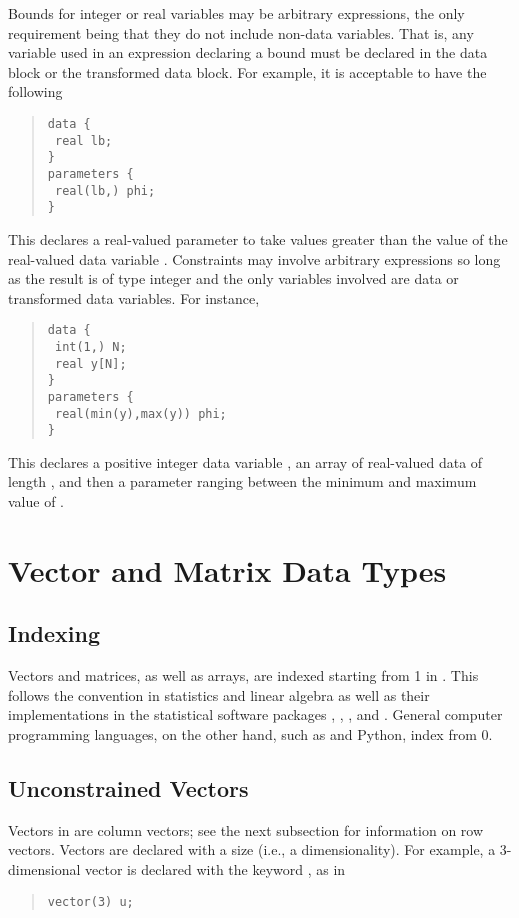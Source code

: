 Bounds for integer or real variables may be arbitrary expressions, the
only requirement being that they do not include non-data variables.
That is, any variable used in an expression declaring a bound must be
declared in the data block or the transformed data block.  For
example, it is acceptable to have the following
%
\begin{quote}
\begin{Verbatim}
data { 
 real lb;
}
parameters {
 real(lb,) phi;
}
\end{Verbatim}
\end{quote}
%
This declares a real-valued parameter  to take values
greater than the value of the real-valued data variable .
Constraints may involve arbitrary expressions so long as the result is
of type integer and the only variables involved are data or
transformed data variables.  For instance,
\begin{quote}
\begin{Verbatim}
data { 
 int(1,) N;
 real y[N];
}
parameters {
 real(min(y),max(y)) phi;
}
\end{Verbatim}
\end{quote}
%
This declares a positive integer data variable , an array  of
real-valued data of length , and then a parameter ranging
between the minimum and maximum value of .


\section{Vector and Matrix Data Types}

\subsection{Indexing}

Vectors and matrices, as well as arrays, are indexed starting from 1
in \Stan.  This follows the convention in statistics and linear
algebra as well as their implementations in the statistical software
packages \R, \MATLAB, \BUGS, and \JAGS.  General computer programming
languages, on the other hand, such as \Cpp and Python, index from 0.


\subsection{Unconstrained Vectors}

Vectors in \Stan are column vectors; see the next subsection for
information on row vectors.  Vectors are declared with a size (i.e., a
dimensionality).  For example, a 3-dimensional vector is declared with
the keyword , as in 
%
\begin{quote}
\begin{Verbatim}
vector(3) u;
\end{Verbatim}
\end{quote}
%

